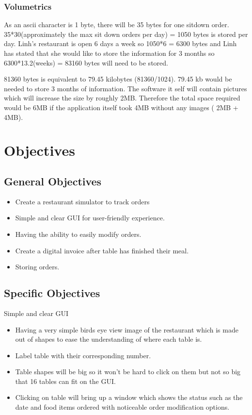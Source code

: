 \subsubsection{Volumetrics}

As an ascii character is 1 byte, there will be 35 bytes for one sitdown order. 35*30(approximately the max sit down orders per day) = 1050 bytes is stored per day. Linh's restaurant is open 6 days a week so 1050*6 = 6300 bytes and  Linh has stated that she would like to store the information for 3 months so  6300*13.2(weeks) = 83160 bytes will need to be stored.

81360 bytes is equivalent to 79.45 kilobytes (81360/1024). 79.45 kb would be needed to store 3 months of information. The software it self will contain pictures which will increase the size by roughly 2MB. Therefore the total space required would be 6MB if the application itself took 4MB without any images ( 2MB + 4MB).





\section{Objectives}

\subsection{General Objectives}

\begin {itemize}
	\item Create a restaurant simulator  to track orders
	\item Simple and clear GUI for user-friendly experience.
	\item Having the ability to easily modify orders.
	\item Create a digital invoice after table has finished their meal.
	\item Storing orders.
\end {itemize}

\newpage 

\subsection{Specific Objectives}

Simple and clear GUI
\begin {itemize}
	\item Having a very simple birds eye view image of the restaurant which is made out of shapes to ease the understanding of where each table is.
	\item Label table with their corresponding number.
	\item Table shapes will be big so it won't be hard to click on them but not so big that 16 tables can fit on the GUI.
	\item Clicking on table will bring up a window which shows the status such as the date and food items ordered with noticeable order modification options.
\end {itemize} 

